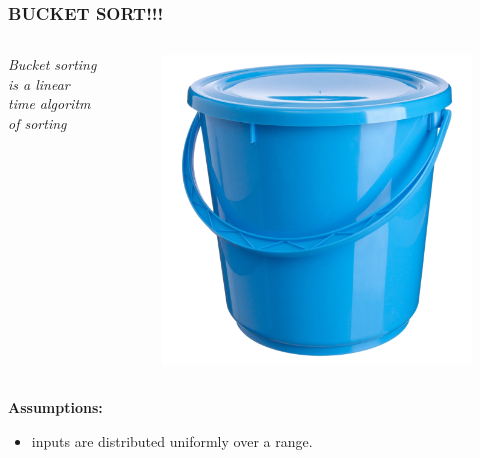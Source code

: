 \documentclass[pdf]{beamer}
\begin{document}
\begin{frame}
	\frametitle{BUCKET SORT!!!}
	\begin{columns}
		\begin{block}{
			\color{black}\textit{Bucket sorting is a linear time algoritm of sorting}}
		\end{block}
		\pause
		\begin{figure}
			\includegraphics[scale=0.1]{Figure/bucket.png}
		\end{figure}
	\end{columns}

\end{frame}


\begin{frame}
	\textbf{Assumptions:}
	\begin{itemize}
		\pause
		\item inputs are distributed uniformly over a range.
	\end{itemize}
\end{frame}
\end{document}
